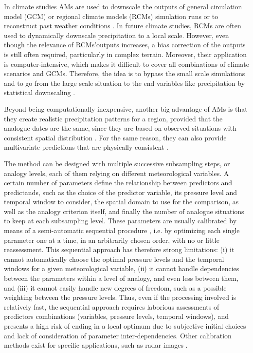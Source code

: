 \documentclass[review]{elsarticle}
\begin{document}
In climate studies AMs are used to downscale the outputs of general circulation model (GCM) or regional climate models (RCMs) simulation runs \citep{Dayon2015} or to reconstruct past weather conditions \citep{Caillouet2016}. In future climate studies, RCMs are often used to dynamically downscale precipitation to a local scale. However, even though the relevance of RCMs'outputs increases, a bias correction of the outputs is still often required, particularly in complex terrain. Moreover, their application is computer-intensive, which makes it difficult to cover all combinations of climate scenarios and GCMs. Therefore, the idea is to bypass the small scale simulations and to go from the large scale situation to the end variables like precipitation by statistical downscaling \citep{Maraun2010}. 

Beyond being computationally inexpensive, another big advantage of AMs is that they create realistic precipitation patterns for a region, provided that the analogue dates are the same, since they are based on observed situations with consistent spatial distribution \citep{Radanovics2013, Chardon2014}. For the same reason, they can also provide multivariate predictions that are physically consistent \citep{Raynaud2016b}.

The method can be designed with multiple successive subsampling steps, or analogy levels, each of them relying on different meteorological variables. A certain number of parameters define the relationship between predictors and predictands, such as the choice of the predictor variable, its pressure level and temporal window to consider, the spatial domain to use for the comparison, as well as the analogy criterion itself, and finally the number of analogue situations to keep at each subsampling level. These parameters are usually calibrated by means of a semi-automatic sequential procedure \citep{Bontron2004, Radanovics2013}, i.e. by optimizing each single parameter one at a time, in an arbitrarily chosen order, with no or little reassessment. This sequential approach has therefore strong limitations: (i) it cannot automatically choose the optimal pressure levels and the temporal windows for a given meteorological variable, (ii) it cannot handle dependencies between the parameters within a level of analogy, and even less between them, and (iii) it cannot easily handle new degrees of freedom, such as a possible weighting between the pressure levels. Thus, even if the processing involved is relatively fast, the sequential approach requires laborious assessments of predictors combinations (variables, pressure levels, temporal windows), and presents a high risk of ending in a local optimum due to subjective initial choices and lack of consideration of parameter inter-dependencies. Other calibration methods exist for specific applications, such as radar images \citep{Panziera2011, Foresti2015a}.
\end{document}
